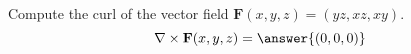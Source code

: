 \begin{problem}
Compute the curl of the vector field $\mathbf{F}(x,y,z) = (yz,xz,xy)$.
\[
\nabla\times\mathbf{F}(x,y,z) = \answer{(0,0,0)}
\]
\end{problem}